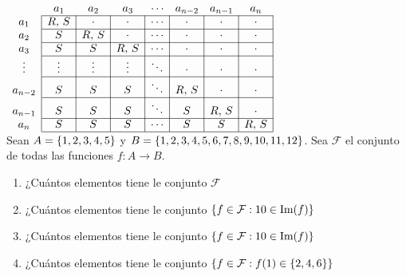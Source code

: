 \documentclass[12pt,a4paper, spanish]{article}
\begin{document}
$
	\begin{array}{c|c|c|c|c|c|c|c|}
		\multicolumn{1}{c}{} & \multicolumn{1}{c}{a_1} & \multicolumn{1}{c}{a_2} & \multicolumn{1}{c}{a_3} & \multicolumn{1}{c}{\cdots} & \multicolumn{1}{c}{a_{n-2}} & \multicolumn{1}{c}{a_{n-1}} & \multicolumn{1}{c}{a_n} \\ \cline{2-8}
		a_1                  & R,\, S                  & \cdot                   & \cdot                   & \cdots                     & \cdot                       & \cdot                       & \cdot                   \\ \cline{2-8}
		a_2                  & S                       & R,\, S                  & \cdot                   & \cdots                     & \cdot                       & \cdot                       & \cdot                   \\ \cline{2-8}
		a_3                  & S                       & S                       & R,\, S                  & \cdots                     & \cdot                       & \cdot                       & \cdot                   \\ \cline{2-8}
		\vdots               & \vdots                  & \vdots                  & \vdots                  & \ddots                     & \cdot                       & \cdot                       & \cdot                   \\ \cline{2-8}
		a_{n-2}              & S                       & S                       & S                       & \ddots                     & R,\, S                      & \cdot                       & \cdot                   \\ \cline{2-8}
		a_{n-1}              & S                       & S                       & S                       & \ddots                     & S                           & R,\, S                      & \cdot                   \\ \cline{2-8}
		a_n                  & S                       & S                       & S                       & \cdots                     & S                           & S                           & R,\, S                  \\ \cline{2-8}
	\end{array}
$\\

\ejercicio
Sean $A = \left\{ 1,2,3,4,5 \right\}$ y $B = \left\{ 1,2,3,4,5,6,7,8,9,10,11,12 \right\}$. Sea $\mathcal F$ el conjunto de todas las funciones
$f: A \to B$.
\begin{enumerate}[label=\roman*)]
	\item  ¿Cuántos elementos tiene le conjunto $\mathcal F$
	\item  ¿Cuántos elementos tiene le conjunto $\left\{ f \in \mathcal F : 10 \in \text{Im}(f)  \right\}$
	\item  ¿Cuántos elementos tiene le conjunto $\left\{ f \in \mathcal F : 10 \in \text{Im}(f) \right\}$
	\item  ¿Cuántos elementos tiene le conjunto $\left\{ f \in \mathcal F : f(1) \in \left\{ 2,4,6 \right\}  \right\}$
\end{enumerate}
\end{document}
